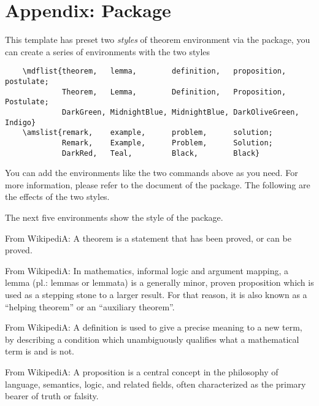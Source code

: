 \chapter{Appendix: Package }

This template has preset two \emph{styles} of theorem environment via the  package, you can create a series of environments with the two styles
\begin{verbatim}
    \mdflist{theorem,   lemma,        definition,   proposition,    postulate;
             Theorem,   Lemma,        Definition,   Proposition,    Postulate;
             DarkGreen, MidnightBlue, MidnightBlue, DarkOliveGreen, Indigo}
    \amslist{remark,    example,      problem,      solution;
             Remark,    Example,      Problem,      Solution;
             DarkRed,   Teal,         Black,        Black}
\end{verbatim}

You can add the environments like the two commands above as you need. For more information, please refer to the document of the  package. The following are the effects of the two styles.

The next five environments show the style of the  package.

\begin{theorem}\leavevmode\newline
    From WikipediA: A theorem is a statement that has been proved, or can be proved.
\end{theorem}

\begin{lemma}\leavevmode\newline
    From WikipediA: In mathematics, informal logic and argument mapping, a lemma (pl.: lemmas or lemmata) is a generally minor, proven proposition which is used as a stepping stone to a larger result. For that reason, it is also known as a ``helping theorem'' or an ``auxiliary theorem''.
\end{lemma}

\begin{definition}\leavevmode\newline
    From WikipediA: A definition is used to give a precise meaning to a new term, by describing a condition which unambiguously qualifies what a mathematical term is and is not.
\end{definition}

\begin{proposition}\leavevmode\newline
    From WikipediA: A proposition is a central concept in the philosophy of language, semantics, logic, and related fields, often characterized as the primary bearer of truth or falsity.
\end{proposition}

